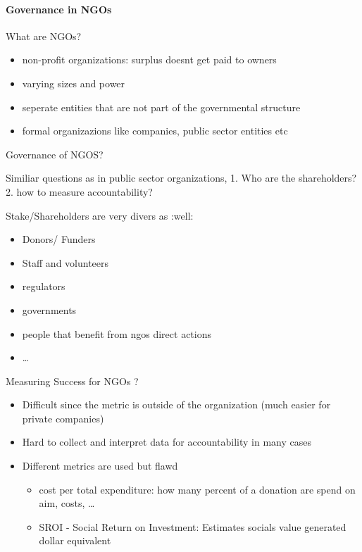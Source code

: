 \documentclass[
]{article}
\providecommand{\tightlist}{%
  \setlength{\itemsep}{0pt}\setlength{\parskip}{0pt}}
\begin{document}
\hypertarget{governance-in-ngos}{%
\paragraph{Governance in NGOs}\label{governance-in-ngos}}

What are NGOs?

\begin{itemize}
\tightlist
\item
  non-profit organizations: surplus doesnt get paid to owners
\item
  varying sizes and power
\item
  seperate entities that are not part of the governmental structure
\item
  formal organizazions like companies, public sector entities etc
\end{itemize}

Governance of NGOS?

Similiar questions as in public sector organizations, 1. Who are the
shareholders? 2. how to measure accountability?

Stake/Shareholders are very divers as :well:

\begin{itemize}
\tightlist
\item
  Donors/ Funders
\item
  Staff and volunteers
\item
  regulators
\item
  governments
\item
  people that benefit from ngos direct actions
\item
  \ldots{}
\end{itemize}

Measuring Success for NGOs ?

\begin{itemize}
\tightlist
\item
  Difficult since the metric is outside of the organization (much easier
  for private companies)
\item
  Hard to collect and interpret data for accountability in many cases
\item
  Different metrics are used but flawd

  \begin{itemize}
  \tightlist
  \item
    cost per total expenditure: how many percent of a donation are spend
    on aim, costs, \ldots{}
  \item
    SROI - Social Return on Investment: Estimates socials value
    generated dollar equivalent
  \end{itemize}
\end{itemize}
\end{document}
